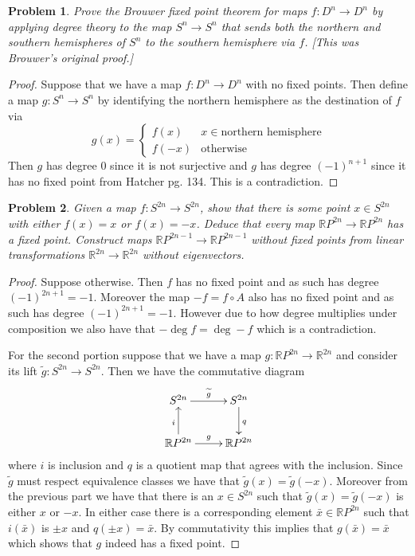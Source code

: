 \documentclass[10pt]{article}
\newcommand{\sk}{\vskip 10mm}
\newcommand{\bb}[1]{\mathbb{#1}}
\theoremstyle{plain}
\newtheorem{problem}{Problem}
\theoremstyle{remark}
\begin{document}
\begin{problem}
  Prove the Brouwer fixed point theorem for maps $f:D^n\rightarrow D^n$
  by applying degree theory to the map $S^n\rightarrow S^n$ that sends
  both the northern and southern hemispheres of $S^n$ to the
  southern hemisphere via $f$. [This was Brouwer's original proof.]
\end{problem}

\begin{proof}
  Suppose that we have a map $f:D^n\rightarrow D^n$ with no fixed points.
  Then define a map $g:S^n\rightarrow S^n$ by identifying the northern
  hemisphere as the destination of $f$ via
  \[
    g(x) =
    \left\{
      \begin{array}{ll}
        f(x) & x\in \text{northern hemisphere}\\
        f(-x) & \text{otherwise}               
      \end{array}
    \right.
  \]
  Then $g$ has degree 0 since it is not surjective and $g$
  has degree $(-1)^{n+1}$ since it has no fixed point from Hatcher pg. 134.
  This is a contradiction.
\end{proof}

\sk

\begin{problem}
  Given a map $f:S^{2n}\rightarrow S^{2n}$, show that there is some point
  $x\in S^{2n}$ with either $f(x)=x$ or $f(x)=-x$. Deduce that
  every map $\bb{R}P^{2n}\rightarrow \bb{R}P^{2n}$ has a fixed point.
  Construct maps $\bb{R}P^{2n-1}\rightarrow\bb{R}P^{2n-1}$ without fixed points
  from linear transformations $\bb{R}^{2n}\rightarrow\bb{R}^{2n}$ without
  eigenvectors.
\end{problem}

\begin{proof}
  Suppose otherwise. Then $f$ has no fixed point and as such
  has degree $(-1)^{2n+1}=-1$. Moreover the map $-f=f\circ A$ also
  has no fixed point and as such has degree $(-1)^{2n+1}=-1$.
  However due to how degree multiplies under composition we also
  have that $-\deg f=\deg -f$ which is a contradiction.

  \sk

  For the second portion suppose that we have a map
  $g:\bb{R}P^{2n}\rightarrow\bb{R}^{2n}$ and consider its lift
  $\widetilde{g}:S^{2n}\rightarrow S^{2n}$. Then we have the commutative
  diagram
  \[
    \xymatrix{
      S^{2n} \ar[r]^{\widetilde{g}} & S^{2n} \ar[d]^q\\
      \bb{R}P^{2n} \ar[u]^i \ar[r]^g & \bb{R}P^{2n}
    }
  \]
  where $i$ is inclusion and $q$ is a quotient map that agrees
  with the inclusion. Since $\widetilde{g}$ must respect
  equivalence classes we have that $\widetilde{g}(x)=\widetilde{g}(-x)$.
  Moreover from the previous part we have that there is an
  $x\in S^{2n}$ such that $\widetilde{g}(x)=\widetilde{g}(-x)$ is either
  $x$ or $-x$. In either case there is a corresponding element
  $\bar{x}\in\bb{R}P^{2n}$ such that $i(\bar{x})$ is $\pm x$ and $q(\pm x)=\bar{x}$.
  By commutativity this implies that $g(\bar{x})=\bar{x}$ which shows
  that $g$ indeed has a fixed point.  
\end{proof}
\end{document}
